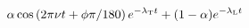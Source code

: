 \documentclass[12pt]{article}
\begin{document}
\begin{displaymath}
\alpha \cos\left(2\pi\nu t + \phi\pi/180\right) e^{-\lambda_{\rm T} t} + (1-\alpha) e^{-\lambda_{\rm L} t}
\end{displaymath}
\end{document}

